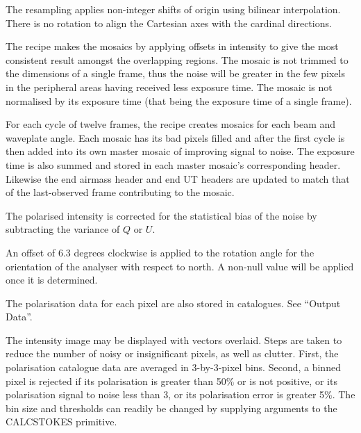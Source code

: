 \documentclass[twoside,11pt]{article}
\newcommand{\htmlref}[2]{#1}
\renewcommand{\_}{\texttt{\symbol{95}}}
\newcommand{\sstitem}{\item}
\begin{document}
{{{         \sstitem
         The resampling applies non-integer shifts of origin using
         bilinear interpolation.  There is no rotation to align the
         Cartesian axes with the cardinal directions.

         \sstitem
         The recipe makes the mosaics by applying offsets in intensity
         to give the most consistent result amongst the overlapping regions.
         The mosaic is not trimmed to the dimensions of a single frame, thus
         the noise will be greater in the few pixels in the peripheral areas
         having received less exposure time.  The mosaic is not normalised by
         its exposure time (that being the exposure time of a single frame).

         \sstitem
         For each cycle of twelve frames, the recipe creates mosaics
         for each beam and waveplate angle.  Each mosaic has its bad pixels
         filled and after the first cycle is then added into its own master
         mosaic of improving signal to noise.  The exposure time is also
         summed and stored in each master mosaic's corresponding
	 header. Likewise the end airmass header and end UT headers
	 are updated to match that of the last-observed frame
	 contributing to the mosaic.

         \sstitem
         The polarised intensity is corrected for the statistical bias
         of the noise by subtracting the variance of $Q$ or $U$.

         \sstitem
         An offset of 6.3 degrees clockwise is applied to the rotation
         angle for the orientation of the analyser with respect to north.
         A non-null value will be applied once it is determined.

         \sstitem
         The polarisation data for each pixel are also stored in
         catalogues.  See \htmlref{``Output Data''}{paj_data}.

         \sstitem
         The intensity image may be displayed with vectors overlaid.
         Steps are taken to reduce the number of noisy or insignificant
         pixels, as well as clutter.  First, the polarisation catalogue data
         are averaged in 3-by-3-pixel bins.  Second, a binned pixel is
         rejected if its polarisation is greater than 50\% or is not positive,
         or its polarisation signal to noise less than 3, or its polarisation
         error is greater 5\%.  The bin size and thresholds can readily be
         changed by supplying arguments to the \_CALC\_STOKES\_ primitive.

}}}
\end{document}
